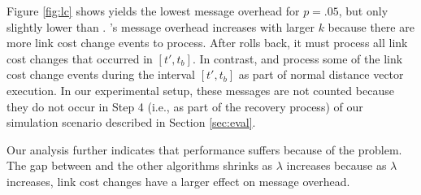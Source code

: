 Figure \ref{fig:lc} shows \purge yields the lowest message overhead for $p=.05$, but only slightly lower than \cprs. 
\cprs's message overhead increases with larger $k$ because there are more link cost change events to process. After \cpr rolls back, it must process all link cost
changes that occurred in $[t',t_b]$. 
In contrast, \second and \purge process some of the link cost change events during the interval $[t',t_b]$ as part of normal distance vector execution. 
In our experimental setup, these messages are not counted because 
they do not occur in Step 4 (i.e., as part of the recovery process) of our simulation scenario described in Section \ref{sec:eval}.

Our analysis further indicates that \second performance suffers because of the \infinity problem. %
The gap between \second and the other algorithms shrinks as $\lambda$ increases because as $\lambda$ increases, link cost changes have a larger effect on message overhead.


\begin{figure*}[t]
\centering
{}
\caption{Experiment 6: Message overhead for $p=\{0.05,0.15\}$ \er with link weights selected uniformly random with different $\lambda$ values.}
\label{fig:lc}
\end{figure*}


